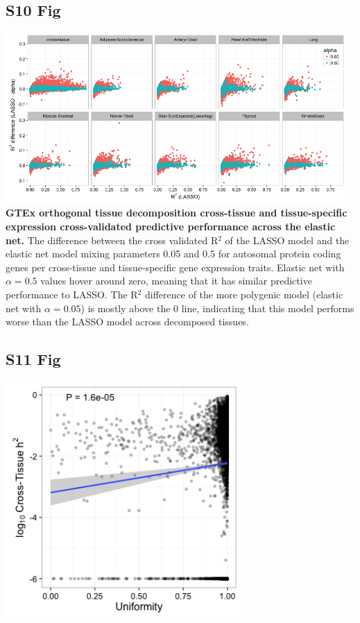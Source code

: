 \documentclass[10pt,letterpaper]{article}
\begin{document}
\begin{singlespace}
\subsection*{S10 Fig}
\includegraphics[width=13cm]{Figures/GenArch_Supp/S7Fig.png}
\label{S10_Fig}
{\bf GTEx orthogonal tissue decomposition cross-tissue and tissue-specific expression cross-validated predictive performance across the elastic net.} The difference between the cross validated R$^2$ of the LASSO model and the elastic net model mixing parameters 0.05 and 0.5 for autosomal protein coding genes per cross-tissue and tissue-specific gene expression traits. Elastic net with $\alpha=0.5$ values hover around zero, meaning that it has similar predictive performance to LASSO. The R$^2$ difference of the more polygenic model (elastic net with $\alpha=0.05$) is mostly above the 0 line, indicating that this model performs worse than the LASSO model across decomposed tissues.
\end{singlespace}
\pagebreak

\subsection*{S11 Fig}
\includegraphics[width=9cm]{Figures/Fig-CT-entropy-continuous-lm.png}
\label{S11_Fig}
\end{document}
